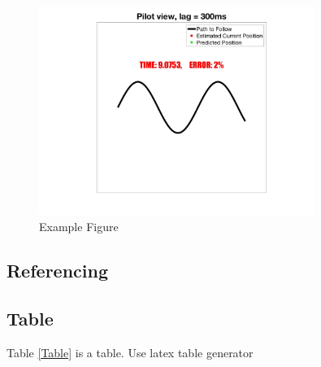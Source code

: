 \documentclass{article}
\begin{document}
\begin{figure}[H]
	\centering
	\includegraphics[width = 0.8\textwidth]{Figures/Example}
	\caption{Example Figure}
	\label{example}
\end{figure}

\subsection{Referencing \cite{litRev2}}
\subsection{Table}
Table \ref{Table} is a table. Use latex table generator
\end{document}
